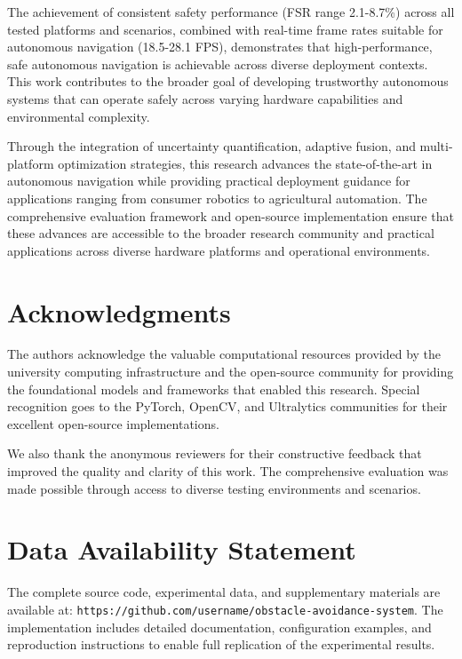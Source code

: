 \documentclass[10pt]{article}
\begin{document}
The achievement of consistent safety performance (FSR range 2.1-8.7\%) across all tested platforms and scenarios, combined with real-time frame rates suitable for autonomous navigation (18.5-28.1 FPS), demonstrates that high-performance, safe autonomous navigation is achievable across diverse deployment contexts. This work contributes to the broader goal of developing trustworthy autonomous systems that can operate safely across varying hardware capabilities and environmental complexity.

Through the integration of uncertainty quantification, adaptive fusion, and multi-platform optimization strategies, this research advances the state-of-the-art in autonomous navigation while providing practical deployment guidance for applications ranging from consumer robotics to agricultural automation. The comprehensive evaluation framework and open-source implementation ensure that these advances are accessible to the broader research community and practical applications across diverse hardware platforms and operational environments.

\section*{Acknowledgments}

The authors acknowledge the valuable computational resources provided by the university computing infrastructure and the open-source community for providing the foundational models and frameworks that enabled this research. Special recognition goes to the PyTorch, OpenCV, and Ultralytics communities for their excellent open-source implementations.

We also thank the anonymous reviewers for their constructive feedback that improved the quality and clarity of this work. The comprehensive evaluation was made possible through access to diverse testing environments and scenarios.

\section*{Data Availability Statement}

The complete source code, experimental data, and supplementary materials are available at: \texttt{https://github.com/username/obstacle-avoidance-system}. The implementation includes detailed documentation, configuration examples, and reproduction instructions to enable full replication of the experimental results.
\end{document}
